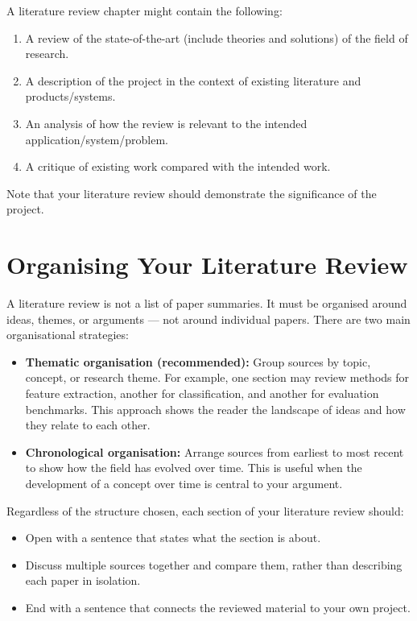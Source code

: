 \noindent A literature review chapter might contain the following:
\begin{enumerate}
    \item A review of the state-of-the-art (include theories and solutions) of 
    the field of research.
    \item A description of the project in the context of existing literature 
    and products/systems.
    \item An analysis of how the review is relevant to the intended 
    application/system/problem.
    \item A critique of existing work compared with the intended work.
\end{enumerate}
Note that your literature review should demonstrate the significance of the project.

\section{Organising Your Literature Review}
\label{sec:lit_organisation}

A literature review is not a list of paper summaries. It must be organised 
around ideas, themes, or arguments — not around individual papers. There are 
two main organisational strategies:

\begin{itemize}
    \item \textbf{Thematic organisation (recommended):} Group sources by topic, 
    concept, or research theme. For example, one section may review methods for 
    feature extraction, another for classification, and another for evaluation 
    benchmarks. This approach shows the reader the landscape of ideas and how 
    they relate to each other.

    \item \textbf{Chronological organisation:} Arrange sources from earliest to 
    most recent to show how the field has evolved over time. This is useful when 
    the development of a concept over time is central to your argument.
\end{itemize}

\noindent Regardless of the structure chosen, each section of your literature 
review should:
\begin{itemize}
    \item Open with a sentence that states what the section is about.
    \item Discuss multiple sources together and compare them, rather than 
    describing each paper in isolation.
    \item End with a sentence that connects the reviewed material to your 
    own project.
\end{itemize}

